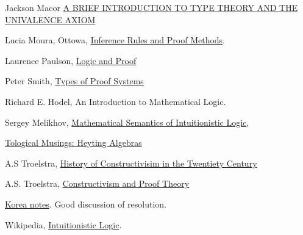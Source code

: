 \begin{thebibliography}
 Jackson Macor \href{https://math.uchicago.edu/~may/REU2015/REUPapers/Macor.pdf}{A  BRIEF  INTRODUCTION  TO  TYPE  THEORY  AND  THE
UNIVALENCE  AXIOM}

 Lucia Moura, Ottowa, \href{https://www.site.uottawa.ca/~lucia/courses/2101-10/lecturenotes/04InferenceRulesProofMethods.pdf}{Inference Rules and Proof Methods}.  

 Laurence Paulson, \href{https://www.cl.cam.ac.uk/teaching/1112/LogicProof/logic-notes.pdf}{Logic and Proof}

 Peter Smith, \href{https://www.logicmatters.net/resources/pdfs/ProofSystems.pdf}{Types of Proof Systems}

 Richard E. Hodel, An Introduction to Mathematical Logic.  

 Sergey Melikhov, \href{https://arxiv.org/pdf/1504.03380.pdf}{Mathematical Semantics of Intuitionistic Logic}, 

 \href{https://topologicalmusings.wordpress.com/2008/04/08/distributivity-topology-and-heyting-algebras/}{Tological Musings: Heyting Algebras}

 A.S Troelstra, \href{http://www.illc.uva.nl/Research/Publications/Reports/ML-1991-05.text.pdf}{History of Constructivisim in the Twentiety Century}

 A.S. Troelstra, \href{http://citeseerx.ist.psu.edu/viewdoc/download?doi=10.1.1.10.6972&rep=rep1&type=pdf}{Constructivism and Proof Theory}

 \href{http://www1.se.cuhk.edu.hk/~seem5750/Lecture_6.pdf}{Korea notes}. Good discussion of resolution.

 Wikipedia, \href{https://en.wikipedia.org/wiki/Intuitionistic_logic}{Intuitionistic Logic}. 

\end{thebibliography}

